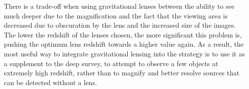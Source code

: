 			There is a trade-off when using gravitational lenses between the ability to see much deeper due to the magnification and the fact that the viewing area is decreased due to obscuration by the lens and the increased size of the images. The lower the redshift of the lenses chosen, the more significant this problem is, pushing the optimum lens redshift towards a higher value again. As a result, the most useful way to integrate gravitational lensing into the strategy is to use it as a supplement to the deep survey, to attempt to observe a few objects at extremely high redshift, rather than to magnify and better resolve sources that can be detected without a lens.

